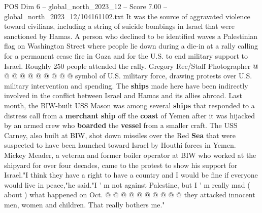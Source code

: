 \begin{textsample}{POS Dim 6 – global\_north\_2023\_12 – Score 7.00 – global\_north\_2023\_12/104161102.txt}
It was the source of aggravated violence toward civilians, including a string of suicide bombings in Israel that were sanctioned by Hamas.
A person who declined to be identified waves a Palestinian flag on Washington Street where people lie down during a die-in at a rally calling for a permanent cease fire in Gaza and for the U.S. to end military support to Israel.
Roughly 250 people attended the rally.
Gregory Rec/Staff Photographer @ @ @ @ @ @ @ @ @ @ symbol of U.S. military force, drawing protests over U.S. military intervention and spending.
The \textbf{ships} made here have been indirectly involved in the conflict between Israel and Hamas and its allies abroad.
Last month, the BIW-built USS Mason was among several \textbf{ships} that responded to a distress call from a \textbf{merchant} \textbf{ship} off the \textbf{coast} of Yemen after it was hijacked by an armed crew who \textbf{boarded} the \textbf{vessel} from a smaller craft.
The USS Carney, also built at BIW, shot down missiles over the Red \textbf{Sea} that were suspected to have been launched toward Israel by Houthi forces in Yemen.
Mickey Meader, a veteran and former boiler operator at BIW who worked at the shipyard for over four decades, came to the protest to show his support for Israel."I think they have a right to have a country and I would be fine if everyone would live in peace,"he said."I ' m not against Palestine, but I ' m really mad ( about ) what happened on Oct. @ @ @ @ @ @ @ @ @ @ they attacked innocent men, women and children.
That really bothers me."

\end{textsample}

